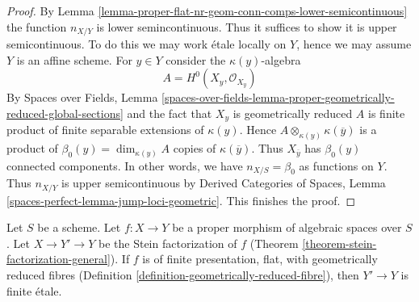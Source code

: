 \begin{proof}
By Lemma \ref{lemma-proper-flat-nr-geom-conn-comps-lower-semicontinuous}
the function $n_{X/Y}$ is lower semincontinuous.
Thus it suffices to show it is upper semicontinuous.
To do this we may work \'etale locally on $Y$, hence we
may assume $Y$ is an affine scheme.
For $y \in Y$ consider the $\kappa(y)$-algebra
$$
A = H^0(X_y, \mathcal{O}_{X_y})
$$
By Spaces over Fields, Lemma
\ref{spaces-over-fields-lemma-proper-geometrically-reduced-global-sections}
and the fact that $X_y$ is geometrically reduced
$A$ is finite product of finite separable extensions of $\kappa(y)$.
Hence $A \otimes_{\kappa(y)} \kappa(\overline{y})$ is a product
of $\beta_0(y) = \dim_{\kappa(y)} A$ copies of $\kappa(\overline{y})$.
Thus $X_{\overline{y}}$ has $\beta_0(y)$ connected components.
In other words, we have $n_{X/S} = \beta_0$ as functions on $Y$.
Thus $n_{X/Y}$ is upper semicontinuous by
Derived Categories of Spaces, Lemma
\ref{spaces-perfect-lemma-jump-loci-geometric}.
This finishes the proof.
\end{proof}

\begin{lemma}
\label{lemma-stein-factorization-etale}
Let $S$ be a scheme.
Let $f : X \to Y$ be a proper morphism of algebraic spaces over $S$.
Let $X \to Y' \to Y$ be the Stein factorization of $f$
(Theorem \ref{theorem-stein-factorization-general}).
If $f$ is of finite presentation, flat, with geometrically
reduced fibres (Definition \ref{definition-geometrically-reduced-fibre}),
then $Y' \to Y$ is finite \'etale.
\end{lemma}

